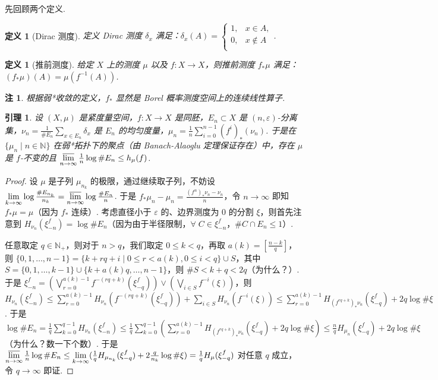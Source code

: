 \documentclass[11pt, a4paper, oneside]{ctexart}
\newtheorem{definition}[theorem]{定义}
\newtheorem{lemma}[theorem]{引理}
\newtheorem{remark}[theorem]{注}
\newcommand{\N}{\mathbb{N}}
\begin{document}
    先回顾两个定义.
    \begin{definition}[Dirac 测度]
        定义 Dirac 测度 $\delta_x$ 满足：$\delta_x(A)=\begin{cases}
            1,&x\in A,\\
            0,&x\notin A\\
        \end{cases}$.
    \end{definition}
    \begin{definition}[推前测度]
        给定 $X$ 上的测度 $\mu$ 以及 $f:X\to X$，则推前测度 $f_*\mu$ 满足：$(f_*\mu)(A)=\mu(f^{-1}(A))$.
    \end{definition}
    \begin{remark}
        根据弱*收敛的定义，$f_*$ 显然是 Borel 概率测度空间上的连续线性算子.
    \end{remark}

    \begin{lemma}\label{引理分离集估计}
        设 $(X,\mu)$ 是紧度量空间，$f:X\to X$ 是同胚，$E_n\subset X$ 是 $(n,\varepsilon)$-分离集，$\nu_n=\frac{1}{\# E_n}\sum\limits_{x\in E_n}\delta_x$ 是 $E_n$ 的均匀度量，$\mu_n=\frac{1}{n}\sum\limits_{i=0}^{n-1}{(f^i)}_*(\nu_n)$. 于是在 $\{\mu_n\mid n\in\N\}$ 在弱*拓扑下的聚点（由 Banach-Alaoglu 定理保证存在）中，存在 $\mu$ 是 $f$-不变的且 $\varlimsup\limits_{n\to\infty}\frac{1}{n}\log \# E_n\leq h_{\mu}(f)$.
    \end{lemma}
    \begin{proof}
        设 $\mu$ 是子列 $\mu_{n_k}$ 的极限，通过继续取子列，不妨设 $\lim\limits_{k\to\infty}\log\frac{\# E_{n_k}}{n_k}=\varlimsup\limits_{n\to\infty}\log\frac{\# E_n}{n}$. 于是 $f_*\mu_n-\mu_n=\frac{{(f^n)}_*\nu_n-\nu_n}{n}$，令 $n\to\infty$ 即知 $f_*\mu=\mu$（因为 $f_*$ 连续）. 考虑直径小于 $\varepsilon$ 的、边界测度为 $0$ 的分割 $\xi$，则首先注意到 $H_{\nu_n}(\xi_{-n}^f)=\log\# E_n$（因为由于半径限制，$\forall\; C\in\xi_{-n}^f$，$\# C\cap E_n\leq 1$）.
        
        任意取定 $q\in\N_+$，则对于 $n>q$，我们取定 $0\leq k<q$，再取 $a(k)=[\frac{n-k}{q}]$，则 $\{0,1,\ldots,n-1\}=\{k+rq+i\mid 0\leq r<a(k),0\leq i<q\}\cup S$，其中 $S=\{0,1,\ldots,k-1\}\cup\{k+a(k)q,\ldots,n-1\}$，则 $\# S<k+q<2q$（为什么？）. 于是 $\xi_{-n}^f=(\bigvee\limits_{r=0}^{a(k)-1}f^{-(rq+k)}(\xi_{-q}^f))\vee(\bigvee\limits_{i\in S}f^{-i}(\xi))$，则 $H_{\nu_n}(\xi_{-n}^f)\leq \sum\limits_{r=0}^{a(k)-1}H_{\nu_n}(f^{-(rq+k)}(\xi_{-q}^f))+\sum\limits_{i\in S}H_{\nu_n}(f^{-i}(\xi))\leq \sum\limits_{r=0}^{a(k)-1}H_{{(f^{rq+k})}_*\nu_n}(\xi_{-q}^f)+2q\log \#\xi$. 于是 $\log \#E_n=\frac{1}{q}\sum\limits_{k=0}^{q-1}H_{\nu_n}(\xi_{-n}^f)\leq \frac{1}{q}\sum\limits_{k=0}^{q-1}(\sum\limits_{r=0}^{a(k)-1}H_{{(f^{rq+k})}_*\nu_n}(\xi_{-q}^f)+2q\log \#\xi)\leq \frac{n}{q}H_{\mu_n}(\xi_{-q}^f)+2q\log\#\xi$（为什么？数一下个数）. 于是 $\varlimsup\limits_{n\to\infty}\frac{1}{n}\log \# E_n\leq \lim\limits_{k\to\infty}(\frac{1}{q}H_{\mu_{n_k}}(\xi_{-q}^f)+2\frac{q}{n_k}\log\#\xi)=\frac{1}{q}H_{\mu}(\xi_{-q}^f)$ 对任意 $q$ 成立，令 $q\to\infty$ 即证.
    \end{proof}
\end{document}
